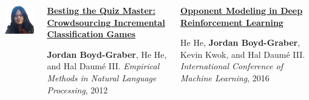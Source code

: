 \documentclass[xcolor=dvipsnames]{beamer}
\begin{document}
\begin{frame}{}

  \begin{columns}
        \includegraphics[width=0.7\linewidth]{general_figures/hehe}
        \begin{block}{{\bf
              \href{http://cs.colorado.edu/~jbg//docs/qb_emnlp_2012.pdf}{Besting
                the Quiz Master: Crowdsourcing Incremental
                Classification Games}}}

          {\bf Jordan Boyd-Graber}, He He, and Hal {Daum\'{e} III}. \emph{Empirical Methods in Natural Language Processing}, 2012
        \end{block}

        \begin{block}{{\bf
              \href{http://www.cs.colorado.edu/~jbg/docs/2016_icml_opponent.pdf}{Opponent Modeling in Deep Reinforcement Learning}}}

          He He, {\bf Jordan Boyd-Graber}, Kevin Kwok, and Hal
          {Daum\'{e} III}. \emph{International Conference of Machine Learning}, 2016
        \end{block}

  \end{columns}
\end{frame}
\end{document}
